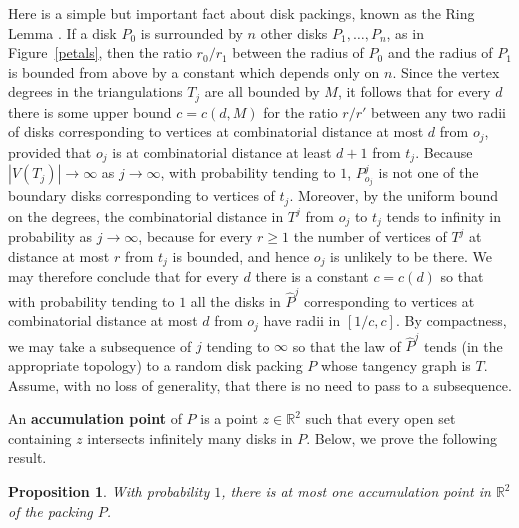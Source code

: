 \documentclass[12pt,naturalnames]{article}
\numberwithin{equation}{section}
\numberwithin{figure}{section}
\numberwithin{theorem}{section}
\newtheorem{prop}[theorem]{Proposition}
\newcommand{\R}{\mathbb{R}}
\def\RodinSullivan{MR90c:30007}
\begin{document}
Here is a simple but important fact about disk
packings, known as the Ring Lemma \cite{\RodinSullivan}.
If a disk $P_0$ is surrounded by $n$ other disks
$P_1,\dots,P_n$, as in Figure~\ref{petals},
then the ratio $r_0/r_1$ between the radius of $P_0$
and the radius of $P_1$ is bounded from above by a constant which
depends only on $n$.  Since the vertex degrees in
the triangulations $T_j$ are all bounded by $M$,
it follows that for every $d$ there is some upper bound
$c=c(d,M)$ for the ratio $r/r'$ between any two
radii of disks corresponding to vertices at combinatorial distance
at most  $d$ from $o_j$, provided that $o_j$ is at combinatorial distance
at least $d+1$ from $t_j$.
Because $|V(T_j)|\to\infty$ as $j\to\infty$,
with probability tending to $1$, $P^j_{o_j}$
is not one of the boundary disks corresponding to
vertices of $t_j$.  Moreover, by the uniform bound on the degrees,
the combinatorial
distance in $T^j$ from $o_j$ to $t_j$ tends to
infinity in probability as $j\to\infty$,
because for every $r\ge 1$ the number of vertices of $T^j$ at
distance at most $r$ from $t_j$ is bounded, and hence $o_j$ is
unlikely to be there.
We may therefore conclude that for every $d$
there is a constant $c=c(d)$
so that with probability tending to $1$ all the
disks in $\hat P^j$ corresponding to vertices
at combinatorial distance at most $d$ from $o_j$
have radii in $[1/c,c]$.  By compactness,
we may take a subsequence of $j$ tending to $\infty$
so that the law of $\hat P^j$ tends (in the appropriate
topology) to a random disk packing $P$ whose tangency
graph is $T$.  Assume, with no loss of generality,
that there is no need to pass to a subsequence.

An {\bf accumulation point} of $P$ is a point $z\in\R^2$
such that every open set containing $z$ intersects infinitely
many disks in $P$.  Below, we prove the following result.

\begin{prop}\label{accum}
With probability $1$, there is at most one accumulation point
in $\R^2$ of the packing $P$.
\end{prop}
\end{document}

